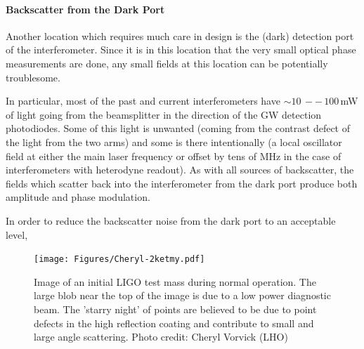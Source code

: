 \paragraph{Backscatter from the Dark Port}
Another location which requires much care in design is the (dark)
detection port of the interferometer. Since it is in this location
that the very small optical phase measurements are done, any small
fields at this location can be potentially troublesome.

In particular, most of the past and current interferometers have
$\sim10\,--\,100$\,mW of light going from the beamsplitter in the
direction of the GW detection photodiodes. Some of this light is
unwanted (coming from the contrast defect of the light from the two
arms) and some is there intentionally (a local oscillator field at
either the main laser frequency or offset by tens of MHz in the case
of interferometers with heterodyne readout). As with all sources of
backscatter, the fields which scatter back into the interferometer
from the dark port produce both amplitude and phase modulation.

In order to reduce the backscatter noise from the dark port to an
acceptable level, 

\begin{figure}[h]
  \centering
    \texttt{[image: Figures/Cheryl-2ketmy.pdf]}
    \caption[Point defects in a LIGO mirror]{Image of an initial LIGO 
      test mass during normal operation. The large blob near the top
      of the image is due to a low power diagnostic beam. The 
      'starry night' of points are believed to be due to point 
      defects in the high reflection coating and contribute to small 
      and large angle scattering. Photo credit: Cheryl Vorvick (LHO)}
    \label{fig:2kETMy}
\end{figure}


